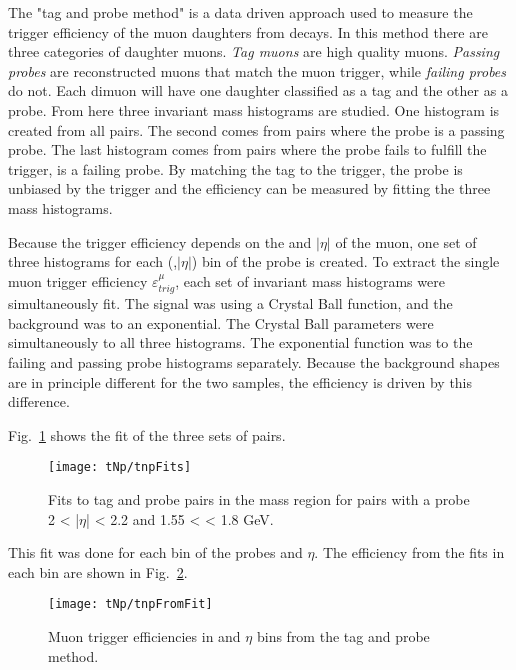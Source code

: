       The "tag and probe method" is a data driven approach used to measure the 
        trigger efficiency of the muon daughters from \JPsi{} decays.
      In this method there are three categories of daughter muons. 
      \textit{Tag muons} are high quality muons.
      \textit{Passing probes} are reconstructed muons that match the muon 
        trigger, while \textit{failing probes} do not. 
      Each dimuon will have one daughter classified as a tag and the other
        as a probe.
      From here three invariant mass histograms are studied. 
      One histogram is created from all pairs. 
      The second comes from pairs where the probe is a passing probe.  
      The last histogram comes from pairs where the probe fails to fulfill
        the trigger, \DIFdelbegin \textit{} %
\DIFdelend \DIFaddbegin {}\DIFaddend is a failing probe. 
      By matching the tag to the trigger, the probe is unbiased by the trigger 
        and the  efficiency can be measured by fitting the three mass 
        histograms. 

      Because the trigger efficiency depends on the \pt{} and $|\eta|$ of the 
        muon, one set of three histograms for each (\pt{},$|\eta|$) bin of the
        probe is created.
      To extract the single muon trigger efficiency $\varepsilon^{\mu}_{trig}$, 
        each set of invariant mass histograms were simultaneously fit. 
      The signal was \DIFdelbegin {}\DIFdelend \DIFaddbegin {}\DIFaddend using a Crystal Ball function, and the background 
        was \DIFdelbegin {}\DIFdelend \DIFaddbegin {}\DIFaddend to an exponential.
      The Crystal Ball parameters were simultaneously \DIFdelbegin {}\DIFdelend \DIFaddbegin {}\DIFaddend to all three 
        histograms.
      The exponential function was \DIFdelbegin {}\DIFdelend \DIFaddbegin {}\DIFaddend to the failing and passing probe 
        histograms separately.
      Because the background shapes are in principle different for the two 
        samples, the efficiency is driven by this difference. 

      Fig.~\ref{fig:tnpFitPlot} shows the fit of the three sets of pairs. 
      \begin{figure}[!Hh]
        \centering
        \texttt{[image: tNp/tnpFits]}
        \caption{Fits to tag and probe pairs in the \JPsi{} mass region for
        pairs with a probe 2 < |$\eta$| < 2.2 and 1.55 < \pt{} < 1.8 GeV.}
        \label{fig:tnpFitPlot}
      \end{figure}
      This fit was done for each bin of the probes \pt{} and $\eta$.
      The efficiency from the fits in each bin are shown in Fig.~\ref{fig:tnpTrigMap}.
      \begin{figure}[!Hhbt]
        \centering
        \texttt{[image: tNp/tnpFromFit]}
        \caption{Muon trigger efficiencies in \pt{} and $\eta$ bins from 
          the tag and probe method.}
        \label{fig:tnpTrigMap}
      \end{figure}


